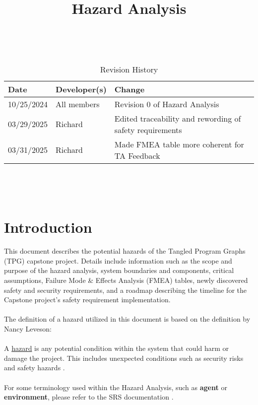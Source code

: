 \documentclass{article}
\title{Hazard Analysis\\\progname}
\author{\authname}
\date{}
\begin{document}
\maketitle
\thispagestyle{empty}

~\newpage


\begin{table}[hp]
\caption{Revision History} \label{TblRevisionHistory}
\begin{tabularx}{\textwidth}{llX}
\toprule
\textbf{Date} & \textbf{Developer(s)} & \textbf{Change}\\
\midrule
10/25/2024 & All members & Revision 0 of Hazard Analysis\\
03/29/2025 & Richard & Edited traceability and rewording of safety requirements \\
03/31/2025 & Richard & Made FMEA table more coherent for TA Feedback \\
\bottomrule
\end{tabularx}
\end{table}

~\newpage

\tableofcontents

~\newpage



\section{Introduction}


This document describes the potential hazards of the Tangled Program Graphs (TPG) capstone project. Details include information such as the scope and purpose of the hazard analysis, system boundaries and components, critical assumptions, Failure Mode \& Effects Analysis (FMEA) tables, newly discovered safety and security requirements, and a roadmap describing the timeline for the Capstone project’s safety requirement implementation. 
\\\\
The definition of a hazard utilized in this document is based on the definition by Nancy Leveson:
\\\\
A \underline{hazard} is any potential condition within the system that could harm or damage the project. This includes unexpected conditions such as security risks and safety hazards \citep{Leveson2020}.
\\\\
For some terminology used within the Hazard Analysis, such as \textbf{agent} or \textbf{environment}, please refer to the SRS documentation \citep{SRS}.
\end{document}
